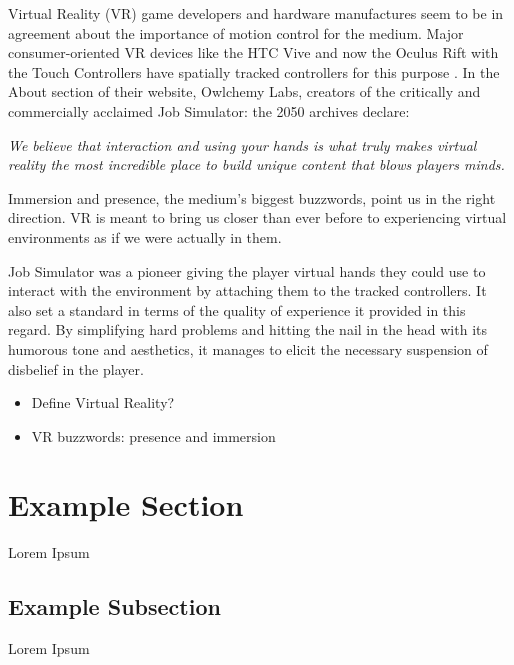 Virtual Reality (VR) game developers and hardware manufactures seem to be in agreement about the importance of motion control for the medium. Major consumer-oriented VR devices like the HTC Vive and now the Oculus Rift with the Touch Controllers have spatially tracked controllers for this purpose \parencite{htcvive2016, oculus2016}. In the About section of their website, Owlchemy Labs, creators of the critically and commercially \parencite{UnityAwards2016, SteamSpyJobSim} acclaimed Job Simulator: the 2050 archives \parencite{OwlchemyLabs2016} declare:

\begin{displayquote}
\textit{We believe that interaction and using your hands is what truly makes virtual reality the most incredible place to build unique content that blows players minds.} \parencite{aboutOwlchemyLabs}
\end{displayquote}

Immersion and presence, the medium's biggest buzzwords, point us in the right direction. VR is meant to bring us closer than ever before to experiencing virtual environments as if we were actually in them.

Job Simulator was a pioneer giving the player virtual hands they could use to interact with the environment by attaching them to the tracked controllers. It also set a standard in terms of the quality of experience it provided in this regard. By simplifying hard problems and hitting the nail in the head with its humorous tone and aesthetics, it manages to elicit the necessary suspension of disbelief in the player.

\begin{itemize}
\item Define Virtual Reality?
\item VR buzzwords: presence and immersion
\end{itemize}

\section{Example Section}
\label{sec:exampleSection}

Lorem Ipsum

\subsection{Example Subsection}
\label{subsec:exampleSubsection}

Lorem Ipsum